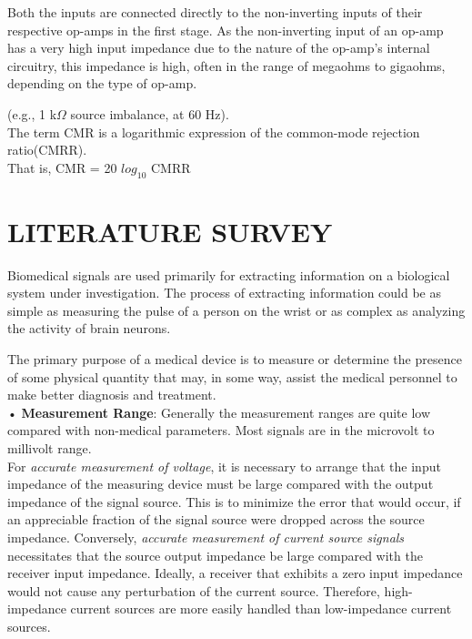 \documentclass[]{article}
\begin{document}
	Both the inputs are connected directly to the non-inverting inputs of their respective op-amps in the first stage. As the non-inverting input of an op-amp has a very high input impedance due to the nature of the op-amp's internal circuitry, this impedance is high, often in the range of megaohms to gigaohms, depending on the type of op-amp.
	
	(e.g., 1 k$\Omega$ source imbalance, at 60 Hz).\\
	\vspace{.10cm}The term CMR is a logarithmic expression of the 
	common-mode rejection ratio(CMRR).\\ That is, CMR = 
	20 $log_{10}$ CMRR



\section{LITERATURE SURVEY}

		Biomedical signals  are used primarily for extracting information on a biological system under investigation. The process of extracting information could be as simple as measuring the pulse of a person on the wrist or as complex as analyzing the activity of brain neurons.
		
		The primary purpose of a medical device is to measure or determine the presence of some physical quantity that may, in some way, assist the medical personnel to make better diagnosis and treatment.\\
		
		•	\textbf{Measurement Range}:  Generally the measurement ranges are quite low compared with non-medical parameters. Most signals are in the microvolt to millivolt range.\\
		
	For \textit{accurate measurement of voltage}, it is necessary to arrange that the input impedance of the measuring device must be large compared with the output impedance of the signal source. This is to minimize the error that would occur, if an appreciable fraction of the signal source were dropped across the source impedance. Conversely, \textit{accurate measurement of current source signals} necessitates that the source output impedance be large compared with the receiver input impedance. Ideally, a receiver that exhibits a zero input impedance would not cause any perturbation of the current source. Therefore, high-impedance current sources are more easily handled than low-impedance current sources.\\
		
\end{document}
